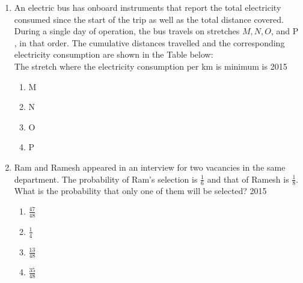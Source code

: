 \documentclass[journal]{IEEEtran}
\begin{document}
\begin{enumerate}
\section*{Misogynous}
\begin{multicols}{4}
    \begin{enumerate}
        \item   Misogynousness
        \item Misogynity
        \item  Misogynously
        \item Misogynous
    \end{enumerate}
\end{multicols}
\item An electric bus has onboard instruments that report the total electricity consumed since the start of the trip as well as the total distance covered. During a single day of operation, the bus travels on stretches ${M}, {N}, {O}$, and P , in that order. The cumulative distances travelled and the corresponding electricity consumption are shown in the Table below:
    \\
    The stretch where the electricity consumption per km is minimum is
    \hfill{2015}
\begin{multicols}{4}
    \begin{enumerate}
        \item M
        \item N
        \item O
        \item P
    \end{enumerate}
\end{multicols}
  
  \item Ram and Ramesh appeared in an interview for two vacancies in the same department. The probability of Ram's selection is $\frac{1} { 6}$ and that of Ramesh is $\frac{1} { 8}$. What is the probability that only one of them will be selected?
  \hfill{2015}
  \begin{multicols}{4}
			\begin{enumerate}
   \item $\frac{47}{48}$
\item $\frac{1}{4}$
\item $\frac{13}{48}$
\item  $\frac{35}{48}$
\end{enumerate}
		\end{multicols}
   

\end{enumerate}
\end{document}
